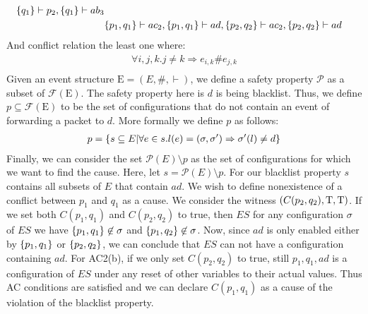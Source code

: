 \begin{example}
\begin{align*}
        \{q_1\} \vdash p_2, \{q_1\} \vdash ab_3 \\
        & \{p_1,q_1\} \vdash ac_2, \{p_1,q_1\} \vdash ad,
        \{p_2,q_2\} \vdash ac_2, \{p_2,q_2\} \vdash ad
    \end{align*}
    And conflict relation the least one where:
    \begin{align*}
        \forall i,j,k. j \neq k \Rightarrow e_{i,k} \# e_{j,k} \\
    \end{align*}
    Given an event structure $\mathrm{E} = (E,\#,\vdash)$, we define a safety
    property $\mathcal{P}$ as a subset of $\mathcal{F}(\mathrm{E})$.
    The safety property here is $d$ is being blacklist. 
    Thus, we define $ p \subseteq \mathcal{F}(\mathrm{E})$ to be the set of 
    configurations that do not contain an event of forwarding a packet to $d$.
    More formally we define $p$ as follows:
    \begin{align*}
        p = \{s \subseteq E| \forall e \in s.  l(e) = (\sigma, \sigma')
         \Rightarrow \sigma'(l) \neq d \}
    \end{align*}
    Finally, we can consider the set $\mathcal{P}(E) \setminus p$ as the 
    set of configurations for which we want to find the cause.
    Here, let $s = \mathcal{P}(E) \setminus p$.
    For our blacklist property $s$ contains all subsets of $E$ that contain $ad$.
    We wish to define nonexistence of a conflict between $p_1$ and $q_1$ 
    as a cause.
    We consider the witness $(C(p_2,q_2),\mathrm{T},\mathrm{T})$.
    If we set both $C(p_1,q_1)$ and $C(p_2,q_2)$ to true, then $ES$ for any 
    configuration $\sigma$ of $ES$ we have $\{p_1,q_1\} \not \in \sigma$ and
    $\{p_1,q_2\} \not \in \sigma$. Now, since $ad$ is only enabled either by
    $\{p_1,q_1\}$ or $\{p_2,q_2\}$, we can conclude that $ES$ can not have a
    configuration containing $ad$.
    For AC2(b), if we only set $C(p_2,q_2)$ to true, still ${p_1,q_1,ad}$ is 
    a configuration of $ES$ under any reset of other variables to their actual 
    values.
    Thus AC conditions are satisfied and we can declare $C(p_1,q_1)$ as a cause of
    the violation of the blacklist property.

\end{example}